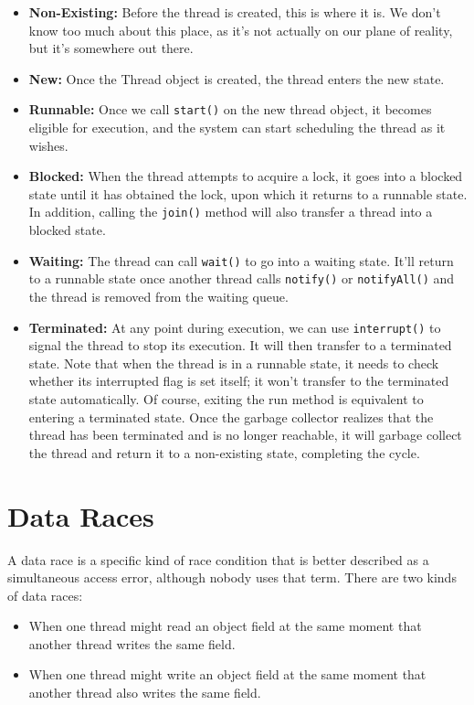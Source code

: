 \documentclass{article}
\begin{document}
\begin{itemize}
    \item \textbf{Non-Existing:} Before the thread is created, this is where it is. We don't know too much about this place, as it's not actually on our plane of reality, but it's somewhere out there.
    \item \textbf{New:} Once the Thread object is created, the thread enters the new state.
    \item \textbf{Runnable:} Once we call \texttt{start()} on the new thread object, it becomes eligible for execution, and the system can start scheduling the thread as it wishes.
    \item \textbf{Blocked:} When the thread attempts to acquire a lock, it goes into a blocked state until it has obtained the lock, upon which it returns to a runnable state. In addition, calling the \texttt{join()} method will also transfer a thread into a blocked state.
    \item \textbf{Waiting:} The thread can call \texttt{wait()} to go into a waiting state. It'll return to a runnable state once another thread calls \texttt{notify()} or \texttt{notifyAll()} and the thread is removed from the waiting queue.
    \item \textbf{Terminated:} At any point during execution, we can use \texttt{interrupt()} to signal the thread to stop its execution. It will then transfer to a terminated state. Note that when the thread is in a runnable state, it needs to check whether its interrupted flag is set itself; it won't transfer to the terminated state automatically. Of course, exiting the run method is equivalent to entering a terminated state. Once the garbage collector realizes that the thread has been terminated and is no longer reachable, it will garbage collect the thread and return it to a non-existing state, completing the cycle.
\end{itemize}

\section{Data Races}

A data race is a specific kind of race condition that is better described as a simultaneous access error, although nobody uses that term. There are two kinds of data races:

\begin{itemize}
    \item When one thread might read an object field at the same moment that another thread writes the same field.
    \item When one thread might write an object field at the same moment that another thread also writes the same field.
\end{itemize}
\end{document}
